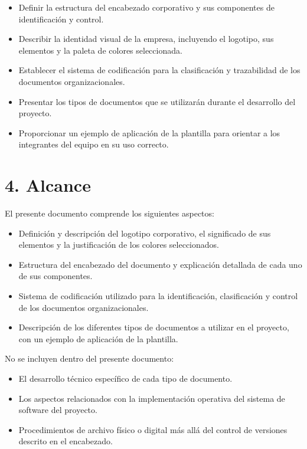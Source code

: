 \documentclass{encabezado}
\begin{document}
\begin{itemize}
    \item Definir la estructura del encabezado corporativo y sus componentes de identificación y control.
    \item Describir la identidad visual de la empresa, incluyendo el logotipo, sus elementos y la paleta de colores seleccionada.
    \item Establecer el sistema de codificación para la clasificación y trazabilidad de los documentos organizacionales.
    \item Presentar los tipos de documentos que se utilizarán durante el desarrollo del proyecto.
    \item Proporcionar un ejemplo de aplicación de la plantilla para orientar a los integrantes del equipo en su uso correcto.
\end{itemize}

\section*{4. Alcance}

El presente documento comprende los siguientes aspectos:

\begin{itemize}
    \item Definición y descripción del logotipo corporativo, el significado de sus elementos y la justificación de los colores seleccionados.
    \item Estructura del encabezado del documento y explicación detallada de cada uno de sus componentes.
    \item Sistema de codificación utilizado para la identificación, clasificación y control de los documentos organizacionales.
    \item Descripción de los diferentes tipos de documentos a utilizar en el proyecto, con un ejemplo de aplicación de la plantilla.
\end{itemize}

No se incluyen dentro del presente documento:

\begin{itemize}
    \item El desarrollo técnico específico de cada tipo de documento.
    \item Los aspectos relacionados con la implementación operativa del sistema de software del proyecto.
    \item Procedimientos de archivo físico o digital más allá del control de versiones descrito en el encabezado.
\end{itemize}
\end{document}
